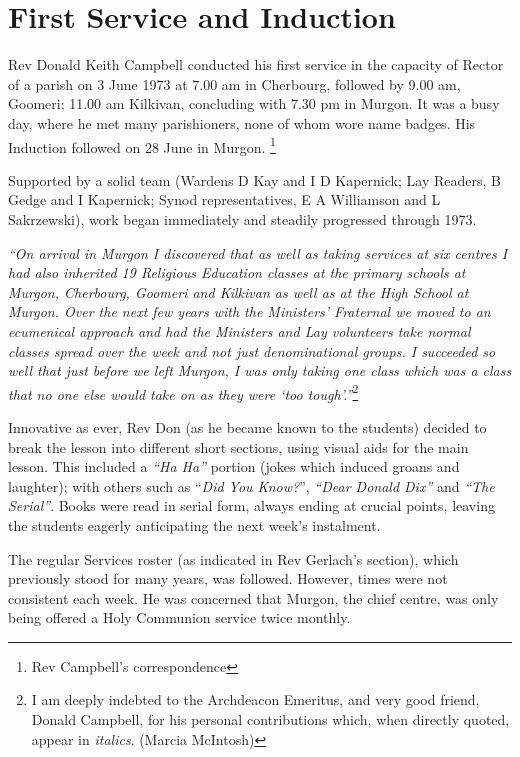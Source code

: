 \section{First Service and Induction}



Rev Donald Keith Campbell conducted his first service in the capacity of Rector of a parish on 3 June 1973 at 7.00 am in Cherbourg, followed by 9.00 am, Goomeri; 11.00 am Kilkivan, concluding with 7.30 pm in Murgon. It was a busy day, where he met many parishioners, none of whom wore name badges. His Induction followed on 28 June in Murgon. \footnote{Rev Campbell's correspondence}


Supported by a solid team (Wardens D Kay and I D Kapernick; Lay Readers, B Gedge and I Kapernick; Synod representatives, E A Williamson and L Sakrzewski), work began immediately and steadily progressed through 1973.



\emph{``On arrival in Murgon I discovered that as well as taking services at six centres I had also inherited 19 Religious Education classes at the primary schools at Murgon, Cherbourg, Goomeri and Kilkivan as well as at the High School at Murgon. Over the next few years with the Ministers' Fraternal we moved to an ecumenical approach and had the Ministers and Lay volunteers take normal classes spread over the week and not just denominational groups. I succeeded so well that just before we left Murgon, I was only taking one class which was a class that no one else would take on as they were `too tough'.''}\footnote{I am deeply indebted to the Archdeacon Emeritus, and very good friend, Donald Campbell, for his personal contributions which, when directly quoted, appear in \emph{italics}. (Marcia McIntosh)}


Innovative as ever, Rev Don (as he became known to the students) decided to break the lesson into different short sections, using visual aids for the main lesson. This included a \emph{``Ha Ha''} portion (jokes which induced groans and laughter); with others such as ``\emph{Did You Know?}'', \emph{``Dear Donald Dix''} and \emph{``The Serial''}. Books were read in serial form, always ending at crucial points, leaving the students eagerly anticipating the next week's instalment.



The regular Services roster (as indicated in Rev Gerlach's section), which previously stood for many years, was followed. However, times were not consistent each week. He was concerned that Murgon, the chief centre, was only being offered a Holy Communion service twice monthly.



